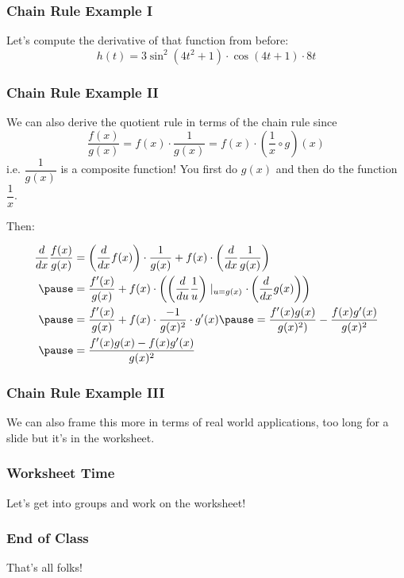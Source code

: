 \documentclass{ltx-talk}
\begin{document}
\begin{frame}
  \frametitle{Chain Rule Example I}
  Let's compute the derivative of that function from before:
  \begin{equation}
    h(t) = 3 \sin^2(4t^2 + 1) \cdot \cos(4t + 1) \cdot 8t
  \end{equation}

\end{frame}

\begin{frame}
  \frametitle{Chain Rule Example II}
  We can also derive the quotient rule in terms of the chain rule since
  \begin{equation}
    \dfrac{f(x)}{g(x)} = f(x) \cdot \dfrac{1}{g(x)} = f(x) \cdot (\dfrac{1}{x} \circ g)(x)
  \end{equation}
  i.e. $\dfrac{1}{g(x)}$ is a composite function! You first do $g(x)$ and then do the function $\dfrac{1}{x}$. \pause

  Then: 

  \begin{align}
    \dfrac{d}{dx} \dfrac{f(x)}{g(x)} &= \left(\dfrac{d}{dx} f(x)\right) \cdot \dfrac{1}{g(x)} + f(x) \cdot \left(\dfrac{d}{dx} \dfrac{1}{g(x)}\right) \\ \pause
                                     &= \dfrac{f'(x)}{g(x)} + f(x) \cdot \left(\left(\dfrac{d}{du} \dfrac{1}{u}\right)\mid_{u=g(x)} \cdot \left(\dfrac{d}{dx} g(x)\right)\right) \\ \pause
                                     &= \dfrac{f'(x)}{g(x)} + f(x) \cdot \dfrac{-1}{g(x)^2} \cdot g'(x) \pause
                                     = \dfrac{f'(x) g(x)}{g(x)^2)} - \dfrac{f(x)g'(x)}{g(x)^2} \\ \pause
                                     &= \dfrac{f'(x) g(x) - f(x) g'(x)}{g(x)^2}
  \end{align}
\end{frame}

\begin{frame}
  \frametitle{Chain Rule Example III}
  We can also frame this more in terms of real world applications, too long for a slide but it's in the worksheet.
\end{frame}

\begin{frame}
  \frametitle{Worksheet Time}

  Let's get into groups and work on the worksheet!
\end{frame}

\begin{frame}
  \frametitle{End of Class}

  That's all folks!
\end{frame}
\end{document}
